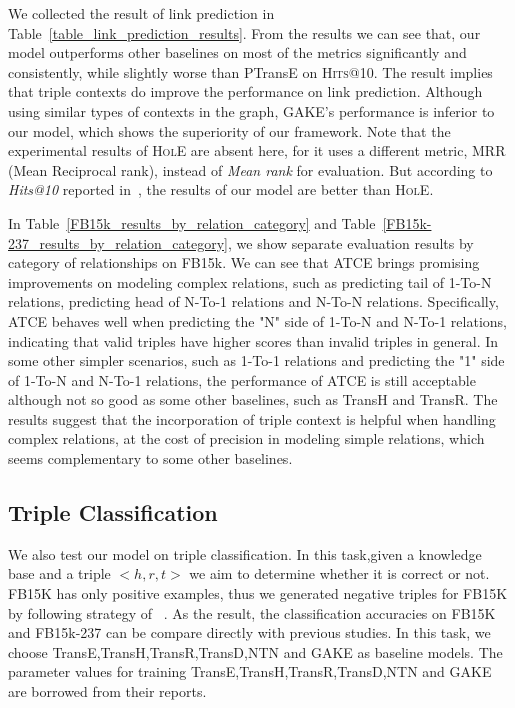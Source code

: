 We collected the result of link prediction in Table~\ref{table_link_prediction_results}. From the results we can see that, our model outperforms other baselines on most of the metrics significantly and consistently, while slightly worse than PTransE on \textsc{Hits}@10. The result implies that triple contexts do improve the performance on link prediction. Although using similar types of contexts in the graph, GAKE's performance is inferior to our model, which shows the superiority of our framework. Note that the experimental results of \textsc{HolE} are absent here, for it uses a different metric, MRR (Mean Reciprocal rank), instead of \textit{Mean rank} for evaluation. But according to \textit{Hits@10} reported in~\cite{NickelRP16}, the results of our model are better than \textsc{HolE}.


In Table~\ref{FB15k_results_by_relation_category} and Table~\ref{FB15k-237_results_by_relation_category}, we show separate evaluation results by category of relationships on FB15k. We can see that ATCE brings promising improvements on modeling complex relations, such as predicting tail of 1-To-N relations, predicting head of N-To-1 relations and N-To-N relations. Specifically, ATCE behaves well when predicting the "N" side of 1-To-N and N-To-1 relations, indicating that valid triples have higher scores than invalid triples in general. In some other simpler scenarios, such as 1-To-1 relations and predicting the "1" side of 1-To-N and N-To-1 relations, the performance of ATCE is still acceptable although not so good as some other baselines, such as TransH and TransR. The results suggest that the incorporation of triple context is helpful when handling complex relations, at the cost of precision in modeling simple relations, which seems complementary to some other baselines.
\subsection{Triple Classification}
We also test our model on triple classification. In this task,given a knowledge base and a triple $<h,r,t>$ we aim to determine whether it is correct or not. FB15K has only positive examples, thus we generated negative triples for FB15K by following strategy of ~\cite{socher2013}. As the result, the classification accuracies on FB15K and FB15k-237 can be compare directly with previous studies. In this task, we choose TransE,TransH,TransR,TransD,NTN and GAKE as baseline models. The parameter values for training TransE,TransH,TransR,TransD,NTN and GAKE are borrowed from their reports.

